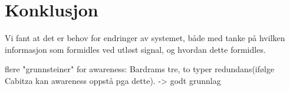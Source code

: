 \chapter{Konklusjon}
\label{chp:konklusjon}
Vi fant at det er behov for endringer av systemet, både med tanke på hvilken informasjon som formidles ved utløst signal, og hvordan dette formidles.

flere "grunnsteiner" for awareness: Bardrams tre, to typer redundans(ifølge Cabitza kan awareness oppstå pga dette). -> godt grunnlag